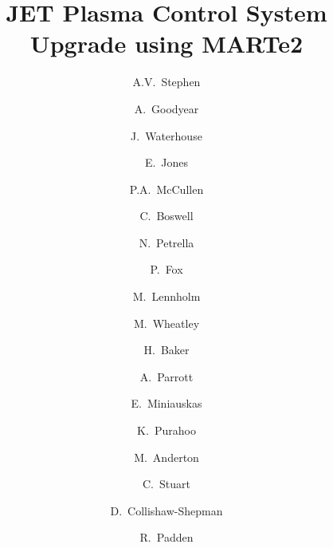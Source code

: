 \documentclass[preprint]{elsarticle}
\begin{document}
\begin{frontmatter}



\title{JET Plasma Control System Upgrade using MARTe2}


	\author[UKAEA]{A.V.~Stephen} %
\author[UKAEA]{A.~Goodyear}
\author[UKAEA]{J.~Waterhouse}
\author[UKAEA]{E.~Jones}
\author[UKAEA]{P.A.~McCullen}
\author[UKAEA]{C.~Boswell}
\author[UKAEA]{N.~Petrella}
\author[UKAEA]{P.~Fox}
\author[UKAEA]{M.~Lennholm}
\author[UKAEA]{M.~Wheatley}
\author[UKAEA]{H.~Baker}
\author[UKAEA]{A.~Parrott}
\author[UKAEA]{E.~Miniauskas}
\author[UKAEA]{K.~Purahoo}
\author[UKAEA]{M.~Anderton}
\author[UKAEA]{C.~Stuart}
\author[UKAEA]{D.~Collishaw-Shepman}
\author[UKAEA]{R.~Padden}



\end{frontmatter}
\end{document}
